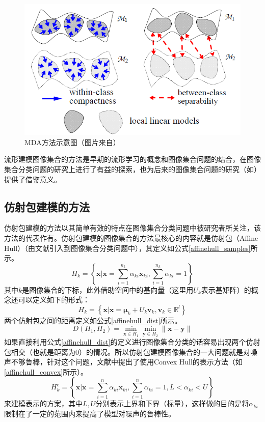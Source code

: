 \begin{figure}[h]
	\centering
	\includegraphics[width=0.7\linewidth]{source/MDA.png}
	\caption[MDA方法示意图]{MDA方法示意图（图片来自\cite{Manifold_MDA}）}
	\label{fig:MDA}
\end{figure}

流形建模图像集合的方法是早期的流形学习的概念和图像集合问题的结合，在图像集合分类问题的研究上进行了有益的探索，也为后来的图像集合问题的研究（如\cite{Statistics_DARG,Statistics_BeyondGauss}）提供了借鉴意义。
\subsection{仿射包建模的方法}
\label{sec:current_Affinehull}
仿射包建模的方法以其简单有效的特点在图像集合分类问题中被研究者所关注，该方法的代表作有\cite{Affinehull_AF,Affinehull_SANP,Affinehull_RNP,Affinehull_ProNN}。仿射包建模的图像集合的方法最核心的内容就是仿射包（Affine Hull）（由文献\cite{Affinehull_AF}引入到图像集合分类问题中），其定义如公式\ref{affinehull_samples}所示。
\begin{equation}
\label{affinehull_samples}
H_k=\left\{\bm{x}|\bm{x}=\sum_{i=1}^{n_{k}} \alpha_{ki} \bm{x}_{ki},\sum_{i=1}^{n_{k}} \alpha_{ki} =1 \right\}
\end{equation}
其中$k$是图像集合的下标，此外借助空间中的基向量（这里用$U_k$表示基矩阵）的概念还可以定义如下的形式：
\begin{equation}
\label{affinehull_bases}
H_k=\left\{\bm{x}|\bm{x}=\bm{\mu}_k+U_k \bm{v}_k,\bm{v}_k \in \mathbb{R}^l\right\} 
\end{equation}
两个仿射包之间的距离定义如公式\ref{affinehull_dist}所示。
\begin{equation}
\label{affinehull_dist}
D(H_1,H_2)=\min_{\bm{x}\in H_1}\min_{\bm{y}\in H_2}\|\bm{x}-\bm{y}\| 
\end{equation}
如果直接利用公式\ref{affinehull_dist}的定义进行图像集合分类的话容易出现两个仿射包相交（也就是距离为0）的情况。所以仿射包建模图像集合的一大问题就是对噪声不够鲁棒，针对这个问题，文献\cite{Affinehull_AF}中提出了使用Convex Hull的表示方法（如\ref{affinehull_convex}所示）。
\begin{equation}
\label{affinehull_convex}
H_k^c=\left\{\bm{x}|\bm{x}=\sum_{i=1}^n \alpha_{ki} \bm{x}_{ki},\sum_{i=1}^n \alpha_{ki}=1,L< \alpha_{ki}<U\right\} 
\end{equation}
来建模表示的方案，其中$L,U$分别表示上界和下界（标量），这样做的目的是将$\alpha_{ki}$限制在了一定的范围内来提高了模型对噪声的鲁棒性。

